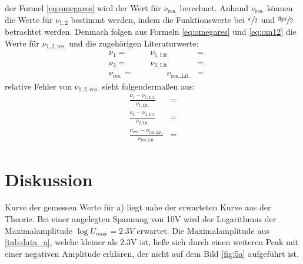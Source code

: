   \justifying der Formel \eqref{eq:omegares} wird der Wert für $\nu_{\text{res.}}$ berechnet. Anhand $\nu_{\text{res.}}$
  können die Werte für $\nu_{1,2}$ bestimmt werden, indem die Funktionswerte bei $\sfrac{\pi}{2}$ und 
  $\sfrac{3 \\pi}{2}$ betrachtet werden. Demnach folgen aus Formeln \eqref{eq:omegares} und \eqref{eq:om12} die Werte für $\nu_{1,2,\text{res.}}$ und die
  zugehörigen Literaturwerte:
  \begin{subequations}
  \begin{align}
    &\nu_1 = \text{} \qquad &\nu_{1,\text{Lit.}} &= \text{}\\
    &\nu_2 = \text{} \qquad &\nu_{2,\text{Lit.}} &= \text{}\\
    &\nu_{\text{res.}} = \text{} &\qquad \nu_{\text{res.,Lit.}} &= \text{}
  \end{align}
  \end{subequations}
  \justifying relative Fehler von $\nu_{1,2,res.}$ sieht folgendermaßen aus:
  \begin{subequations}
  \begin{align}
    \frac{\nu_1 - \nu_{1,\text{Lit.}}}{\nu_{1,\text{Lit.}}} &= \text{}\\
    \frac{\nu_2 - \nu_{2,\text{Lit.}}}{\nu_{2,\text{Lit.}}} &= \text{}\\
    \frac{\nu_{\text{res.}} - \nu_{\text{res.,Lit.}}}{\nu_{\text{res.,Lit.}}} &= \text{}
  \end{align} 
  \end{subequations}
  \newpage


\section{Diskussion}\justifying

\justifying Kurve der gemessen Werte für a) liegt nahe der erwarteten Kurve aus der Theorie. Bei einer angelegten 
Spannung von 10V wird der Logarithmus der Maximalamplitude $\log{U_{max}} = 2.3V$ erwartet. Die Maximalamplitude aus \ref{tab:data_a}, 
welche kleiner als 2.3V ist, ließe sich durch einen weiteren Peak mit einer negativen Amplitude erklären, der nicht auf dem Bild 
\ref{fig:5a} aufgeführt ist. 

